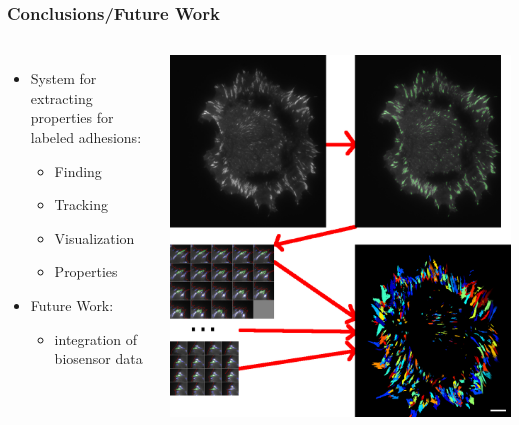 \documentclass{beamer}
\begin{document}
\begin{frame}
	\frametitle{Conclusions/Future Work}
	\begin{columns}
		\begin{itemize}
		\item System for extracting properties for labeled adhesions:
			\begin{itemize}
			\item Finding
			\item Tracking
			\item Visualization
			\item Properties
			\end{itemize}
		\item Future Work:
			\begin{itemize}
			\item integration of biosensor data
			\end{itemize}
		\end{itemize}
		\begin{center}
		\includegraphics[height=0.4\textheight]{figures/finding/ident_overview}

\end{center}
\end{columns}
\end{frame}
\end{document}
